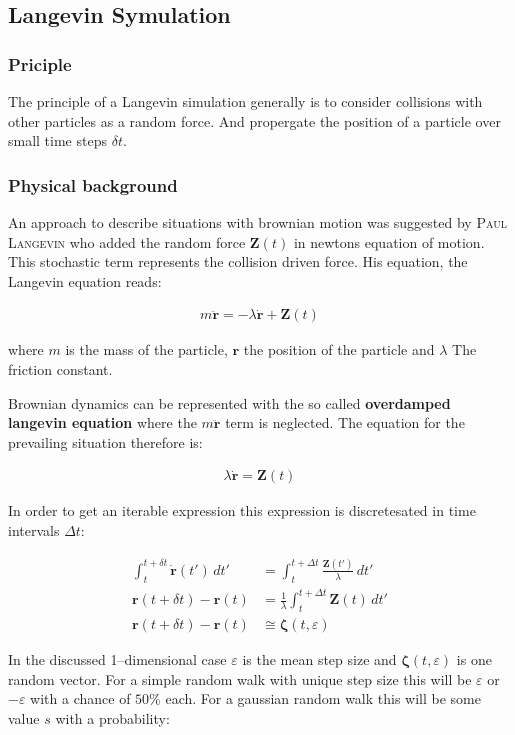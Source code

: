 \documentclass[a4paper, parskip=half]{scrartcl}
\newcommand{\person}[1]{%
	\textsc{#1}%
}
\newcommand{\effect}[1]{%
	\textbf{#1}%
}
\begin{document}
\subsection{Langevin Symulation}
\subsubsection{Priciple}
The principle of a Langevin simulation generally is to consider collisions with other particles as a random force. And propergate the position of a particle over small time steps $\delta t$.
\subsubsection{Physical background}
An approach to describe situations with brownian motion was suggested by \person{Paul Langevin} who added the random force $\mathbf{Z}(t)$ in newtons equation of motion. This stochastic term represents the collision driven force. His equation, the Langevin equation reads:

\begin{align}
m \ddot{\mathbf{r}} = -\lambda\dot{\mathbf{r}} + \mathbf{Z}(t)
\end{align}

where $m$ is the mass of the particle, $\mathbf{r}$ the position of the particle and $\lambda$ The friction constant.

Brownian dynamics can be represented with the so called \effect{overdamped langevin equation} where the $m \ddot{\mathbf{r}}$ term is neglected. The equation for the prevailing situation therefore is:

\begin{align}
\lambda\dot{\mathbf{r}} = \mathbf{Z}(t)
\end{align}

In order to get an iterable expression this expression is discretesated in time intervals $\Delta t$:

\begin{align}
\int_t^{t+ \delta t} \dot{\mathbf{r}}(t')\, dt' &= \int_t^{t+ \Delta t} \frac{\mathbf{Z}(t')}{\lambda}\, dt' \\
\mathbf{r}(t + \delta t) - \mathbf{r}(t) &= \frac{1}{\lambda} \int_t^{t+ \Delta t} \mathbf{Z}(t)\, dt'\\
\mathbf{r}(t + \delta t) - \mathbf{r}(t) &\cong \boldsymbol{\zeta}(t, \varepsilon)
\end{align}

In the discussed 1--dimensional case $\varepsilon$ is the mean step size and $\boldsymbol{\zeta}(t, \varepsilon)$ is one random vector. For a simple random walk with unique step size this will be $\varepsilon$ or $-\varepsilon$ with a chance of $50\%$ each. For a gaussian random walk this will be some value $s$ with a probability:
\end{document}
